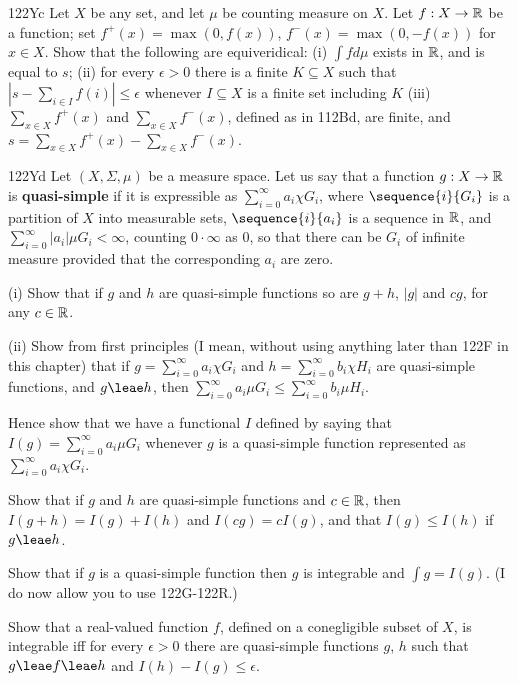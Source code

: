 {\spheader 122Yc Let $X$ be any set, and let $\mu$ be counting
measure on $X$.   Let $f:X\to\Bbb R$ be a function;  set
$f^+(x)=\max(0,f(x))$, $f^-(x)=\max(0,-f(x))$ for $x\in X$.   Show
that the following are equiveridical:  (i) $\int fd\mu$ exists in $\Bbb R$,
and is equal to $s$;  (ii) for every $\epsilon>0$ there is a finite
$K\subseteq X$ such that $|s-\sum_{i\in I}f(i)|\le\epsilon$ whenever
$I\subseteq X$ is
a finite set including $K$ (iii) $\sum_{x\in X}f^+(x)$ and
$\sum_{x\in X}f^-(x)$, defined as in 112Bd, are finite, and
$s=\sum_{x\in X}f^+(x)-\sum_{x\in X}f^-(x)$.

\spheader 122Yd Let $(X,\Sigma,\mu)$ be a measure space.   Let
us say that a function $g:X\to\Bbb R$ is {\bf quasi-simple} if it is
expressible as $\sum_{i=0}^{\infty}a_i\chi G_i$, where
$\sequence{i}{G_i}$ is a partition of $X$ into measurable sets,
$\sequence{i}{a_i}$ is a sequence in $\Bbb R$, and
$\sum_{i=0}^{\infty}|a_i|\mu G_i<\infty$, counting $0\cdot\infty$ as
$0$, so that there can be $G_i$ of infinite measure provided that the
corresponding $a_i$ are zero.

\quad(i) Show that if $g$ and $h$ are quasi-simple functions so are
$g+h$, $|g|$ and $cg$, for any $c\in \Bbb R$.   

\quad(ii) Show from first principles (I mean, without using anything
later than 122F in this chapter) that if
$g=\sum_{i=0}^{\infty}a_i\chi G_i$ and
$h=\sum_{i=0}^{\infty}b_i\chi H_i$ are quasi-simple
functions, and  $g\leae h$, then
$\sum_{i=0}^{\infty}a_i\mu G_i\le\sum_{i=0}^{\infty}b_i\mu H_i$.

 Hence show that we have a functional $I$ defined by
saying that $I(g)=\sum_{i=0}^{\infty}a_i\mu G_i$ whenever $g$ is a
quasi-simple
function represented as $\sum_{i=0}^{\infty}a_i\chi G_i$.

 Show that if $g$ and $h$ are quasi-simple functions and
$c\in\Bbb R$,
then $I(g+h)=I(g)+I(h)$ and $I(cg)=cI(g)$, and that $I(g)\le I(h)$ if
$g\leae h$.

 Show that if $g$ is a quasi-simple function then $g$ is
integrable and $\int g=I(g)$.   (I do now allow you to use
122G-122R.)

 Show that a real-valued function $f$, defined on a
conegligible subset of $X$, is integrable iff for every $\epsilon>0$
there are quasi-simple functions $g$, $h$ such that $g\leae f\leae h$
and $I(h)-I(g)\le\epsilon$.

}
